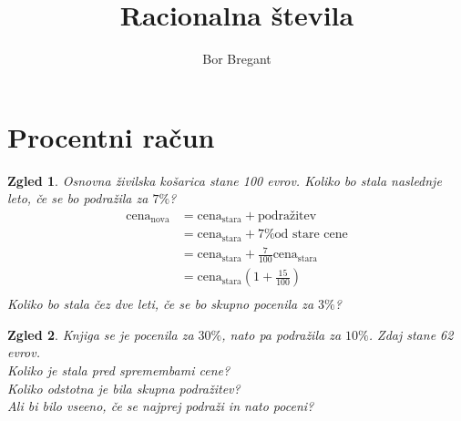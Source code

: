 \documentclass{article}
\title{Racionalna števila}
\author{Bor Bregant}
\date{\vspace{-5ex}}
\newtheorem*{zgled}{Zgled}
\begin{document}
\maketitle

\section*{Procentni račun}

\begin{zgled}
    Osnovna živilska košarica stane 100 evrov. Koliko bo stala naslednje leto, če se bo podražila za $7\%$?
    \begin{align*}
        \text{cena}_{\text{nova}} &= \text{cena}_{\text{stara}}+\text{podražitev}\\
            &= \text{cena}_{\text{stara}}+7\% \text{od stare cene}\\
            &= \text{cena}_{\text{stara}}+\frac{7}{100}\text{cena}_{\text{stara}}\\
            &= \text{cena}_{\text{stara}}\left(1+\frac{15}{100}\right)\\
    \end{align*}
    Koliko bo stala čez dve leti, če se bo skupno pocenila za $3\%$?
\end{zgled}

\begin{zgled}
    Knjiga se je pocenila za $30\%$, nato pa podražila za $10\%$. Zdaj stane 62 evrov.\\
    Koliko je stala pred spremembami cene?\\
    Koliko odstotna je bila skupna podražitev?\\
    Ali bi bilo vseeno, če se najprej podraži in nato poceni?
\end{zgled}
\end{document}
